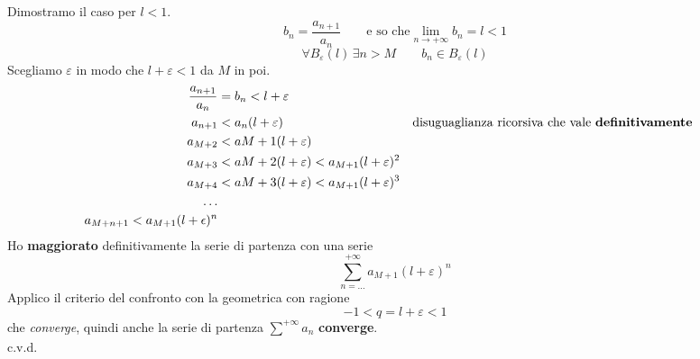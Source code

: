 \documentclass[../dimostrazioni]{subfiles}
\begin{document}
            Dimostramo il caso per \(l < 1\). 
            \[b_n = \frac{a_{n+1}}{a_n} \qquad \text{e so che} \lim_{n \to +\infty}b_n = l < 1 \] 
            \[\forall B_\varepsilon (l) \, \exists n > M \qquad b_n \in B_\varepsilon (l) \]
            Scegliamo \(\varepsilon\) in modo che \(l + \varepsilon < 1 \) da \(M\) in poi.
            \begin{align*}
                \frac{a_{n+1}}{a_n} &= b_n < l + \varepsilon \\
                a_{n+1} &< a_n(l + \varepsilon) && \text{disuguaglianza ricorsiva che vale \textbf{definitivamente}} \\
                a_{M+2} &< a{M+1} (l + \varepsilon) \\
                a_{M+3} &< a{M+2} (l + \varepsilon) < a_{M+1}(l + \varepsilon)^{2}\\
                a_{M+4} &< a{M+3} (l + \varepsilon) < a_{M+1}(l + \varepsilon)^{3} \\
                \qquad \dots \\
                a_{M+n+1}< a_{M+1}(l + \epsilon)^{n}
            \end{align*}
            Ho \textbf{maggiorato} definitivamente la serie di partenza con una serie
            \[ \sum_{n=\dots}^{+\infty} a_{M+1}(l + \varepsilon)^{n}\] 
            Applico il criterio del confronto con la geometrica con ragione
            \[-1 < q = l + \varepsilon < 1 \]
            che \emph{converge}, quindi anche la serie di partenza \(\sum_{}^{+\infty} a_n \) \textbf{converge}. \\
            c.v.d. 




                        
\end{document}
